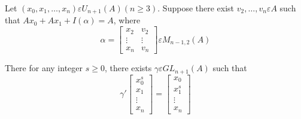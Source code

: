 \begin{lem}\label{c5:lem2.3}
Let $(x_0,x_1,\ldots,x_n) \varepsilon U_{n+1}(A)(n\geq 3)$. Suppose
there exist $v_2,\ldots, v_n\varepsilon A$ such that
$Ax_0+Ax_1+I(\alpha)=A$, where
$$
\alpha=
\begin{bmatrix}
x_2 & v_2\\
\vdots & \vdots\\
x_n & v_n
\end{bmatrix} \varepsilon M_{n-1,2}(A)
$$

There for any integer $s\geq 0$, there exists $\gamma \varepsilon
GL_{n+1}(A)$ such that 
$$
\gamma'
\begin{bmatrix}
x^{s}_0\\
x_1\\
\vdots\\
x_n
\end{bmatrix}=\begin{bmatrix}
x_0\\
x^{s}_1\\
\vdots\\
x_n
\end{bmatrix}
$$
\end{lem}


